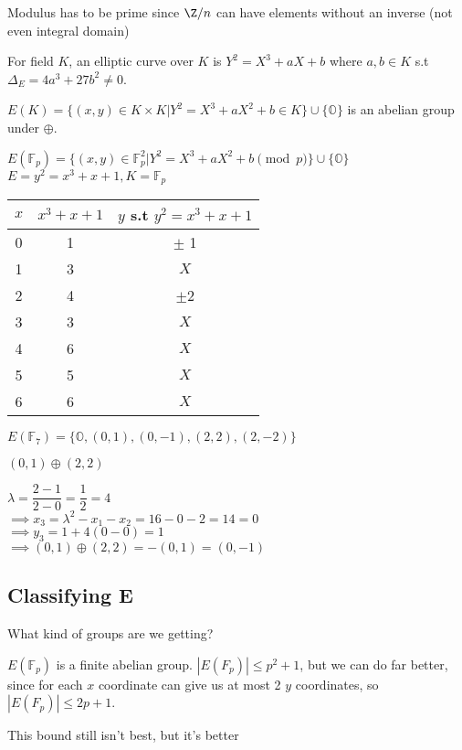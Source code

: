 \documentclass[twoside, 10pt]{article}
\newcommand{\F}{\mathbb{F}}
\renewcommand{\O}{\mathbb{O}}
\begin{document}
\begin{rmk}
    Modulus has to be prime since $\Z/n$ can have elements without an inverse (not even integral domain)
\end{rmk}

\begin{defn}
    For field $K$, an elliptic curve over $K$ is $Y^2 = X^3 + aX + b$ where $a, b \in K$ s.t $\Delta_E = 4a^3 + 27b^2 \neq 0$.
\end{defn}

$E(K) = \{(x, y) \in K \times K | Y^2 = X^3 + aX^2 + b \in K\} \cup \{\O\}$ is an abelian group under $\oplus$. 

\begin{exm*}
    $E(\F_p) = \{(x, y) \in \F_p^2 | Y^2 = X^3 + aX^2 + b\pmod{p}\} \cup \{\O\}$\\
    $E = y^2 = x^3 + x + 1, K = \F_p$
\end{exm*}

\begin{tabular}{c|c|c}
    $x$ & $x^3 + x + 1$ & $y$ s.t $y^2 = x^3 + x + 1$\\
    \hline
    0 & 1 & $\pm$ 1\\
    1 & 3 & $X$\\
    2 & 4 & $\pm$2\\
    3 & 3 & $X$\\
    4 & 6 & $X$\\
    5 & 5 & $X$\\
    6 & 6 & $X$\\
\end{tabular}

$E(\F_7) = \{\O, (0, 1), (0, -1), (2, 2), (2, -2)\}$

$(0, 1) \oplus (2, 2)$

$\lambda = \dfrac{2-1}{2-0} = \dfrac{1}{2} = 4$\\
$\implies x_3 = \lambda^2 - x_1 - x_2 = 16 - 0 - 2 = 14 = 0$\\
$\implies y_3 = 1 + 4(0 - 0) = 1$\\
$\implies (0, 1) \oplus (2, 2) = -(0, 1) = (0, -1)$

\subsection{Classifying E} What kind of groups are we getting?

\begin{exm*}
    $E(\F_p)$ is a finite abelian group. $|E(F_p)| \leq p^2 + 1$, but we can do far better, since for each $x$ coordinate can give us at most 2 $y$ coordinates, so $|E(F_p)| \leq 2p + 1$.
\end{exm*}
This bound still isn't best, but it's better
\end{document}
